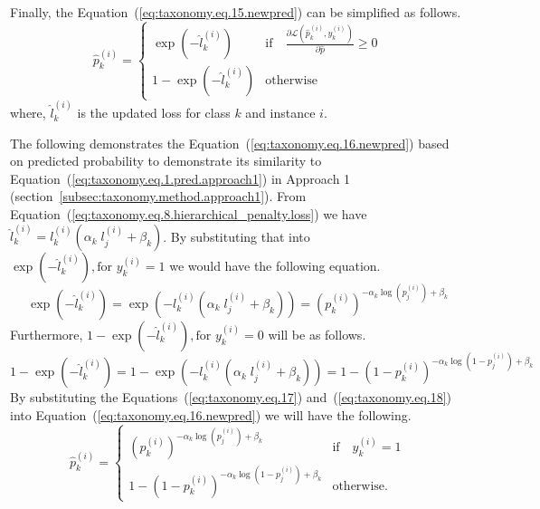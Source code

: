 Finally, the Equation~(\ref{eq:taxonomy.eq.15.newpred}) can be simplified as follows.
\begin{equation}
    \label{eq:taxonomy.eq.16.newpred}
    \widehat{p}_k^{(i)} =
    \begin{cases}
        \exp(-\widehat{l}_k^{(i)}) & \text{if} \quad \frac{\partial \mathcal{L}(\widehat{p}_k^{(i)}, y_k^{(i)})}{\partial \widehat{p}} \geq 0 \\
        1 - \exp(-\widehat{l}_k^{(i)}) & \text{otherwise}
    \end{cases}
\end{equation}
where, ${\widehat l}_k^{(i)} $ is the updated loss for class $k $ and instance $i $.

The following demonstrates the Equation~(\ref{eq:taxonomy.eq.16.newpred})  based on predicted probability to demonstrate its similarity to Equation~(\ref{eq:taxonomy.eq.1.pred.approach1})  in Approach 1 (section~\ref{subsec:taxonomy.method.approach1}). From Equation~(\ref{eq:taxonomy.eq.8.hierarchical_penalty.loss}) we have $\hat{l}_k^{(i)}=l_k^{(i)}\left(\alpha_k\;l_j^{(i)}+\beta_k\right) $. By substituting that into $\exp{\left(-\widehat{l}_{k}^{(i)}\right)}, \text{for } y_{k}^{(i)}=1 $ we would have the following equation.
\begin{equation}
    \label{eq:taxonomy.eq.17}
    \exp{\left(-{\widehat l}_k^{(i)}\right)}=\exp{\left(-l_k^{(i)}\left(\alpha_k\;l_j^{(i)}+\beta_k\right)\right)}={\left(p_k^{(i)}\right)}^{-\alpha_k{\log{\left(p_j^{(i)}\right)}}+\beta_k}
\end{equation}
Furthermore, $1-\exp{\left(-{\widehat l}_k^{(i)}\right)},\text{for } y_k^{(i)}=0 $ will be as follows.
\begin{equation}
    \label{eq:taxonomy.eq.18}
    1-\exp{\left(-{\widehat l}_k^{(i)}\right)}=1-\exp{\left(-l_k^{(i)}\left(\alpha_k\;l_j^{(i)}+\beta_k\right)\right)}={1-\left(1-p_k^{(i)}\right)}^{-\alpha_k{\log{\left(1-p_j^{(i)}\right)}}+\beta_k}
\end{equation}
By substituting the Equations~(\ref{eq:taxonomy.eq.17}) and~(\ref{eq:taxonomy.eq.18})  into Equation~(\ref{eq:taxonomy.eq.16.newpred})  we will have the following.
\begin{equation}
    \label{eq:taxonomy.eq.19.newpred}
    \widehat{p}_k^{(i)} =
    \begin{cases}
        {\left( p_k^{(i)} \right)}^{-\alpha_k \log(p_j^{(i)}) + \beta_k} & \text{if} \quad y_k^{(i)} = 1 \\
        1 - {\left( 1 - p_k^{(i)} \right)}^{-\alpha_k \log{\left( 1 - p_j^{(i)} \right)} + \beta_k} & \text{otherwise.}
    \end{cases}
\end{equation}

